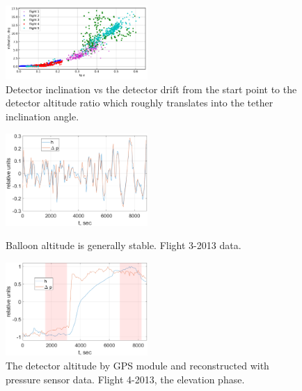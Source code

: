 \documentclass[final,5p,times,twocolumn]{elsarticle}
\begin{document}
\begin{figure}[tb]
\includegraphics[width=0.48\textwidth]{figs/2013_tg-inclination.pdf}
\caption{Detector inclination vs the detector drift from the start point to the detector altitude ratio which roughly translates into the tether inclination angle.}
\label{fig:drift-inclination}
\end{figure}

\begin{figure}[t]
    \includegraphics[width=0.48\textwidth]{figs/good_corr.eps}
    \caption{Balloon altitude is generally stable. Flight 3-2013 data.}
    \label{fig:dp-h-good}
    \vspace{1pc}

    \includegraphics[width=0.48\textwidth]{figs/bad_corr.eps}
    \caption{The detector altitude by GPS module and reconstructed with pressure sensor data. Flight 4-2013, the elevation phase.}
    \label{fig:dp-h-bad}
\end{figure}
\end{document}
